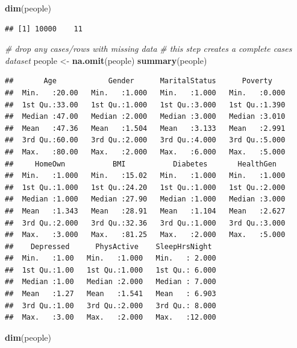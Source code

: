 \documentclass[]{article}
\newenvironment{Shaded}{\begin{snugshade}}{\end{snugshade}}
\newcommand{\KeywordTok}[1]{\textcolor[rgb]{0.13,0.29,0.53}{\textbf{{#1}}}}
\newcommand{\StringTok}[1]{\textcolor[rgb]{0.31,0.60,0.02}{{#1}}}
\newcommand{\CommentTok}[1]{\textcolor[rgb]{0.56,0.35,0.01}{\textit{{#1}}}}
\newcommand{\NormalTok}[1]{{#1}}
\begin{document}
\begin{Shaded}
\begin{Highlighting}[]
\KeywordTok{dim}\NormalTok{(people)}
\end{Highlighting}
\end{Shaded}

\begin{verbatim}
## [1] 10000    11
\end{verbatim}

\begin{Shaded}
\begin{Highlighting}[]
\CommentTok{# drop any cases/rows with missing data}
\CommentTok{# this step creates a complete cases dataset}
\NormalTok{people <-}\StringTok{ }\KeywordTok{na.omit}\NormalTok{(people)}
\KeywordTok{summary}\NormalTok{(people)}
\end{Highlighting}
\end{Shaded}

\begin{verbatim}
##       Age            Gender      MaritalStatus      Poverty     
##  Min.   :20.00   Min.   :1.000   Min.   :1.000   Min.   :0.000  
##  1st Qu.:33.00   1st Qu.:1.000   1st Qu.:3.000   1st Qu.:1.390  
##  Median :47.00   Median :2.000   Median :3.000   Median :3.010  
##  Mean   :47.36   Mean   :1.504   Mean   :3.133   Mean   :2.991  
##  3rd Qu.:60.00   3rd Qu.:2.000   3rd Qu.:4.000   3rd Qu.:5.000  
##  Max.   :80.00   Max.   :2.000   Max.   :6.000   Max.   :5.000  
##     HomeOwn           BMI           Diabetes       HealthGen    
##  Min.   :1.000   Min.   :15.02   Min.   :1.000   Min.   :1.000  
##  1st Qu.:1.000   1st Qu.:24.20   1st Qu.:1.000   1st Qu.:2.000  
##  Median :1.000   Median :27.90   Median :1.000   Median :3.000  
##  Mean   :1.343   Mean   :28.91   Mean   :1.104   Mean   :2.627  
##  3rd Qu.:2.000   3rd Qu.:32.36   3rd Qu.:1.000   3rd Qu.:3.000  
##  Max.   :3.000   Max.   :81.25   Max.   :2.000   Max.   :5.000  
##    Depressed      PhysActive    SleepHrsNight   
##  Min.   :1.00   Min.   :1.000   Min.   : 2.000  
##  1st Qu.:1.00   1st Qu.:1.000   1st Qu.: 6.000  
##  Median :1.00   Median :2.000   Median : 7.000  
##  Mean   :1.27   Mean   :1.541   Mean   : 6.903  
##  3rd Qu.:1.00   3rd Qu.:2.000   3rd Qu.: 8.000  
##  Max.   :3.00   Max.   :2.000   Max.   :12.000
\end{verbatim}

\begin{Shaded}
\begin{Highlighting}[]
\KeywordTok{dim}\NormalTok{(people)}
\end{Highlighting}
\end{Shaded}
\end{document}

